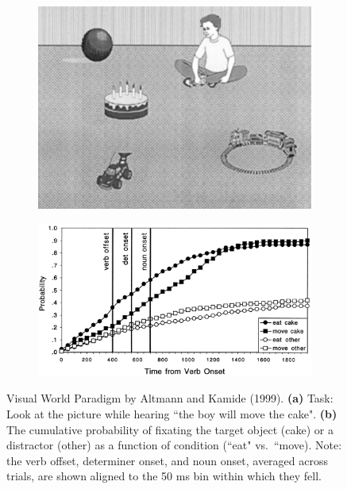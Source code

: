 \begin{figure}[!ht]
    \centering
    \captionsetup{width=.8\linewidth}
    \begin{subfigure}{.42\textwidth}
        \centering
        \captionsetup{width=.8\linewidth}
        \includegraphics[width=.9\linewidth]{images/vwp.png}
        \caption{}
        \label{fig:vwp}
    \end{subfigure}
    \begin{subfigure}{.56\textwidth}
        \centering
        \captionsetup{width=.8\linewidth}
        \includegraphics[width=.9\linewidth]{images/vwp_2.png}
        \caption{}
        \label{fig:vwp_2}
    \end{subfigure}
    \caption{Visual World Paradigm by Altmann and Kamide (1999). \textbf{(a)} Task: Look at the picture while hearing ``the boy will move the cake". \textbf{(b)} The cumulative probability of fixating the target object (cake) or a distractor (other) as a function of condition (``eat" vs.~``move). Note: the verb offset, determiner onset, and noun onset, averaged across trials, are shown aligned to the 50 ms bin within which they fell.}
    \label{fig:vwp_1}
\end{figure}

